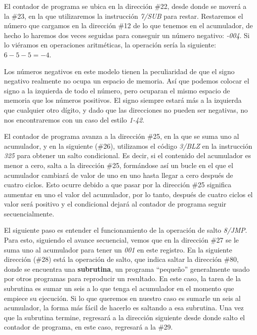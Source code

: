 \documentclass[letterpaper,12pt,oneside]{book}
\begin{document}
	El contador de programa se ubica en la dirección \#22, desde donde se moverá a la \#23, en la que utilizaremos la instrucción \textit{7/SUB} para restar. Restaremos el 
	número que cargamos en la dirección \#12 de lo que tenemos en el acumulador, de hecho lo haremos dos veces seguidas para conseguir un número 	
	negativo: \textit{-004}. Si lo viéramos en operaciones aritméticas, la operación sería la siguiente: $ 6-5-5 = -4 $.
 
    Los números negativos en este modelo tienen la peculiaridad de que el signo negativo realmente no ocupa un espacio de memoria.
	Así que podemos colocar el signo
	a la izquierda de todo el número, pero ocuparan el mismo espacio de memoria que los números positivos.
	El signo siempre estará más a la izquierda que cualquier otro dígito, y dado que las direcciones
	no pueden ser negativas, no nos encontraremos con un caso del estilo \textit{1-42}.
	
	El contador de programa avanza a la dirección \#25, en la que se suma uno al acumulador, y en la siguiente (\#26), utilizamos el código 
	\textit{3/BLZ} en la instrucción \textit{325} para obtener un salto condicional. Es decir, si el contenido del acumulador es menor a cero, salta a la 
	dirección \#25, formándose así un bucle
	en el que el acumulador cambiará de valor de uno en uno hasta llegar a cero después de cuatro ciclos. Esto ocurre
	debido a que pasar por la dirección \#25 significa aumentar en uno el valor del acumulador, por lo tanto, después de cuatro
	ciclos el valor será positivo y el condicional dejará al contador de programa seguir secuencialmente.
	
	
	El siguiente paso es entender el funcionamiento de la operación de salto \textit{8/JMP}. Para esto, siguiendo el avance secuencial, vemos que en la dirección
	\#27 se le suma uno al acumulador para tener un \textit{001} en este registro. En la siguiente dirección (\#28) está la operación
	de salto, que indica saltar
	la dirección \#80, donde se encuentra
	una \textbf{subrutina}, un programa ``pequeño'' generalmente usado por otros programas para reproducir un resultado. En este caso, la tarea
	de la subrutina
	es sumar un seis a lo que tenga el acumulador en el momento que empiece su ejecución. Si lo que queremos en nuestro caso
	es sumarle un seis al acumulador, la forma más fácil de hacerlo es saltando a esa subrutina. Una vez
	que la subrutina termine, regresará a la dirección
	siguiente desde donde salto el contador de programa, en este caso, regresará a la \#29.
	
\end{document}
